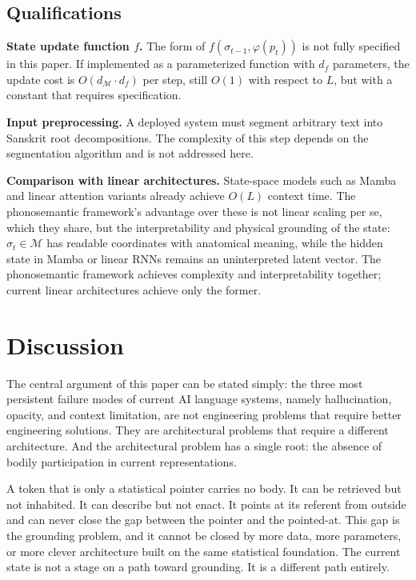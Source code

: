 \documentclass[12pt]{article}
\begin{document}
\subsection{Qualifications}

\textbf{State update function $f$.}
The form of $f(\sigma_{t-1}, \varphi(p_t))$ is not fully specified in this paper. If implemented as a parameterized function with $d_f$ parameters, the update cost is $O(d_\mathcal{M} \cdot d_f)$ per step, still $O(1)$ with respect to $L$, but with a constant that requires specification.

\textbf{Input preprocessing.}
A deployed system must segment arbitrary text into Sanskrit root decompositions. The complexity of this step depends on the segmentation algorithm and is not addressed here.

\textbf{Comparison with linear architectures.}
State-space models such as Mamba \citep{gu2022mamba} and linear attention variants \citep{katharopoulos2020} already achieve $O(L)$ context time. The phonosemantic framework's advantage over these is not linear scaling per se, which they share, but the interpretability and physical grounding of the state: $\sigma_t \in \mathcal{M}$ has readable coordinates with anatomical meaning, while the hidden state in Mamba or linear RNNs remains an uninterpreted latent vector. The phonosemantic framework achieves complexity and interpretability together; current linear architectures achieve only the former.


\section{Discussion}

The central argument of this paper can be stated simply: the three most persistent failure modes of current AI language systems, namely hallucination, opacity, and context limitation, are not engineering problems that require better engineering solutions. They are architectural problems that require a different architecture. And the architectural problem has a single root: the absence of bodily participation in current representations.

A token that is only a statistical pointer carries no body. It can be retrieved but not inhabited. It can describe but not enact. It points at its referent from outside and can never close the gap between the pointer and the pointed-at. This gap is the grounding problem, and it cannot be closed by more data, more parameters, or more clever architecture built on the same statistical foundation. The current state is not a stage on a path toward grounding. It is a different path entirely.
\end{document}
